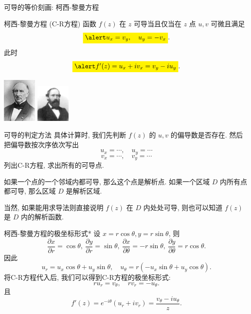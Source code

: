 \begin{frame}{可导的等价刻画: 柯西-黎曼方程}
\begin{block}{柯西-黎曼方程 (C-R方程)}
函数 $f(z)$ 在 $z$ 可导当且仅当在 $z$ 点 $u,v$ 可微且满足 
\[\abox{$u_x=v_y,\quad u_y=-v_x$}.\]
\onslide<+->
此时
\[\abox{$f'(z)=u_x+iv_x=v_y-iu_y$}.\]
\end{block}
\onslide<+->
\begin{center}
\includegraphics[width=1.7cm]{misc/Cauchy.jpeg}
\hspace{2cm}\includegraphics[width=1.7cm]{misc/Riemann.jpeg}
\end{center}
\end{frame}


\begin{frame}{可导的判定方法}
\onslide<+->
具体计算时, 我们先判断 $f(z)$ 的 $u,v$ 的偏导数是否存在.
\onslide<+->
然后把偏导数按次序依次写出
\[u_x=\cdots,\quad u_y=\cdots\]
\[v_x=\cdots,\quad v_y=\cdots\]
列出C-R方程, 求出所有的可导点.

\onslide<+->
如果一个点的一个邻域内都可导, 那么这个点是解析点.
\onslide<+->
如果一个区域 $D$ 内所有点都可导, 那么区域 $D$ 是解析区域.

\onslide<+->
当然, 如果能用求导法则直接说明 $f(z)$ 在 $D$ 内处处可导, 则也可以知道 $f(z)$ 是 $D$ 内的解析函数.
\end{frame}


\begin{frame}{柯西-黎曼方程的极坐标形式*}
\onslide<+->
设 $x=r\cos \theta,y=r\sin\theta$,
\onslide<+->
则
\[\frac{\partial x}{\partial r}=\cos\theta,\ 
\frac{\partial y}{\partial r}=\sin\theta,\ 
\frac{\partial x}{\partial \theta}=-r\sin\theta,\ 
\frac{\partial y}{\partial \theta}=r\cos\theta.\]
\onslide<+->
因此
\[u_r=u_x\cos\theta+u_y\sin\theta,\quad
u_\theta=r(-u_x\sin\theta+u_y\cos\theta).\]
\onslide<+->
将C-R方程代入后, 我们可以得到C-R方程的极坐标形式:
\[ru_r=v_\theta,\quad rv_r=-u_\theta.\]
\onslide<+->
且
\[f'(z)=e^{-i\theta}(u_r+iv_r)=\frac{v_\theta-i u_\theta}z.\]
\end{frame}


